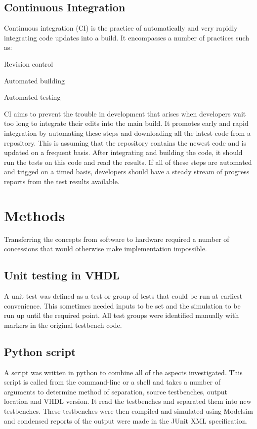 \documentclass[twoside]{article}
\begin{document}
\begin{multicols}{2}
\subsection{Continuous Integration}
Continuous integration (CI) is the practice of automatically and very rapidly integrating code updates into a build. It encompasses a number of practices such as:
\begin{compactitem}
\item Revision control
\item Automated building
\item Automated testing
\end{compactitem}
CI aims to prevent the trouble in development that arises when developers wait too long to integrate their edits into the main build. It promotes early and rapid integration by automating these steps and downloading all the latest code from a repository. This is assuming that the repository contains the newest code and is updated on a frequent basis. After integrating and building the code, it should run the tests on this code and read the results. If all of these steps are automated and trigged on a timed basis, developers should have a steady stream of progress reports from the test results available.\cite{ci1,ci3}


\section{Methods}
Transferring the concepts from software to hardware required a number of concessions that would otherwise make implementation impossible.

\subsection{Unit testing in VHDL}
A unit test was defined as a test or group of tests that could be run at earliest convenience. This sometimes needed inputs to be set and the simulation to be run up until the required point. All test groups were identified manually with markers in the original testbench code.

\subsection{Python script}
A script was written in python to combine all of the aspects investigated. This script is called from the command-line or a shell and takes a number of arguments to determine method of separation, source testbenches, output location and VHDL version. It read the testbenches and separated them into new testbenches. These testbenches were then compiled and simulated using Modelsim and condensed reports of the output were made in the JUnit XML specification.


\end{multicols}
\end{document}
